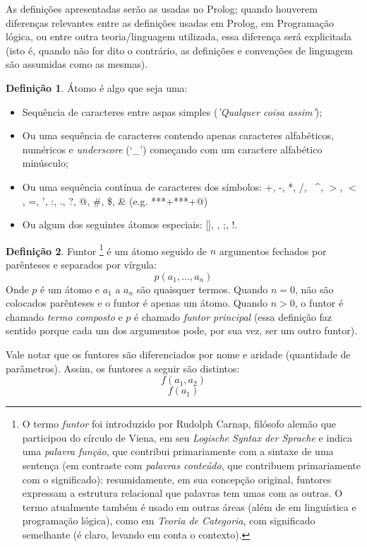 \documentclass{article}
\theoremstyle{definition}
\newtheorem{definition}{Definição}[section]
\theoremstyle{remark}
\begin{document}
As definições apresentadas serão as usadas no Prolog; quando houverem diferenças relevantes entre as definições usadas em Prolog, em Programação lógica, ou entre outra teoria/linguagem utilizada, essa diferença será explicitada (isto é, quando não for dito o contrário, as definições e convenções de linguagem são assumidas como as mesmas).


  \theoremstyle{definition}
  \begin{definition}{Átomo}
  é algo que seja uma:
    \begin{itemize}
      \item Sequência de caracteres entre aspas simples (\textit{'Qualquer coisa assim'});
      \item Ou uma sequência de caracteres contendo apenas caracteres alfabéticos, numéricos e \textit{underscore} (`\_') começando com um caractere alfabético minúsculo;
      \item Ou uma sequência contínua de caracteres dos símbolos: +, -, *, /, \, \^{}, $>$, $<$, =, ', :, ., ?, @, \#, \$, \&\.{} (e.g. ***+***+@)
      \item Ou algum dos seguintes átomos especiais: [], {}, ;, !.
    \end{itemize}
  \end{definition}


  \theoremstyle{definition}
  \begin{definition}{Funtor}
    \footnote{ O termo \textit{funtor} foi introduzido por Rudolph Carnap, filósofo alemão que participou do círculo de Viena, em seu \textit{Logische Syntax der Sprache} e indica uma \textit{palavra função}, que contribui primariamente com a sintaxe de uma sentença (em contraste com \textit{palavras conteúdo}, que contribuem primariamente com o significado): resumidamente, em sua concepção original, funtores expressam a estrutura relacional que palavras tem umas com as outras. O termo atualmente também é usado em outras áreas (além de em linguística e programação lógica), como em \textit{Teoria de Categoria}, com   significado semelhante (é claro, levando em conta o contexto).  }
    é um átomo seguido de $n$ argumentos fechados por parênteses e separados por vírgula:
    \[
      p(a_1, ..., a_n)
    \]
    Onde $p$ é um átomo e $a_1$ a $a_n$ são quaisquer termos. Quando $n = 0$, não são colocados parênteses e o funtor é apenas um átomo. Quando $n > 0$, o funtor é chamado \textit{termo composto} e $p$ é chamado \textit{funtor principal} (essa definição faz sentido porque cada um dos argumentos pode, por sua vez, ser um outro funtor).
  \end{definition}
Vale notar que os funtores são diferenciados por nome e aridade (quantidade de parâmetros). Assim, os funtores a seguir são distintos:
    \[
      f(a_1, a_2)
    \]
    \[
      f(a_1)
    \]
\end{document}
